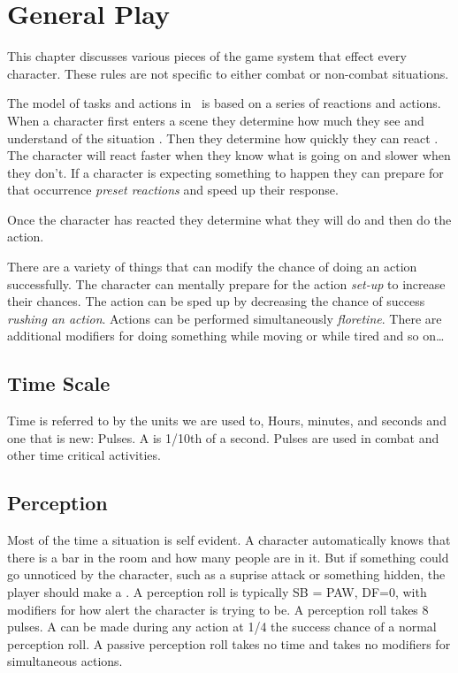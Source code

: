 \chapter{General Play}

This chapter discusses various pieces of the game system that effect 
every character. These rules are not specific to either combat or 
non-combat situations.  

The model of tasks and actions in \SH\ is based on a series of 
reactions and actions. When a character first enters a scene
they determine how much they see and understand of the situation {\em
{}}. Then they determine how quickly they can react {\em 
{}}. The character will react faster when they know what
is going on and slower when they don't. If a character is expecting 
something to happen they can prepare for that occurrence {\em preset 
reactions} and speed up their response. 

Once the character has reacted they determine what they will do and then 
do the action. 

There are a variety of things that can modify the chance of doing an 
action successfully. The character can mentally prepare for the 
action {\em set-up} to increase their chances. The action can be sped 
up by decreasing the chance of success {\em rushing an action}. 
Actions can be performed simultaneously {\em floretine}. There are 
additional modifiers for doing something while moving or while tired 
and so on\dots

\section{Time Scale}

Time is referred to by the units we are used to, Hours, minutes, and seconds 
and one that is new: Pulses. A  is 1/10th of a second. Pulses are
used in combat and other time critical activities.

\section{Perception}

Most of the time a situation is self evident. A character automatically
knows that there is a bar in the room and how many people are in it.
But if something could go unnoticed by the character, such as a suprise 
attack or something hidden, the player should make a . 
A perception roll is typically SB = PAW, DF=0, with modifiers for 
how alert the character is trying to be. A perception roll takes
8 pulses. A  can be made
during any action at 1/4 the success chance of a normal perception roll. A
passive perception roll takes no time and takes no modifiers for 
simultaneous actions.

